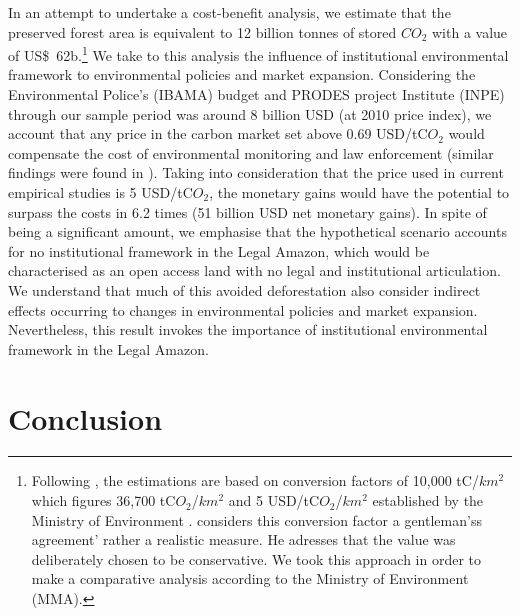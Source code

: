 In an attempt to undertake a cost-benefit analysis, we estimate that the preserved forest area is equivalent to 12 billion tonnes of stored $CO_{2}$ with a value of US\$\ 62b.\footnote{Following \citet{assuncao2015}, the estimations are based on conversion factors of 10,000 tC/$km^{2}$ which figures 36,700 tC$O_{2}$/$km^{2}$ and 5 USD/tC$O_{2}$/$km^{2}$ established by the Ministry of Environment \citep{MMMAwebsite}. \citet{fearnside_2016} considers this conversion factor a gentleman'ss agreement' rather a realistic measure. He adresses that the value was deliberately chosen to be conservative. We took this approach in order to make a comparative analysis according to the Ministry of Environment (MMA).} We take to this analysis the influence of institutional environmental framework to environmental policies and market expansion. Considering the Environmental Police's (IBAMA) budget and PRODES project Institute (INPE) through our sample period was around 8 billion USD (at 2010 price index), we account that any price in the carbon market set above 0.69 USD/tC$O_{2}$  would compensate the cost of environmental monitoring and law enforcement (similar findings were found in \citet{ASSUNCAO_2017}). Taking into consideration that the price used in current empirical studies is 5 USD/tC$O_{2}$, the monetary gains would have the potential to surpass the costs in 6.2 times (51 billion USD net monetary gains). In spite of being a significant amount, we emphasise that the hypothetical scenario accounts for no institutional framework in the Legal Amazon, which would be characterised as an open access land with no legal and institutional articulation. We understand that much of this avoided deforestation also consider indirect effects occurring to changes in environmental policies and market expansion. Nevertheless, this result invokes the importance of institutional environmental framework in the Legal Amazon.


\section{Conclusion}
\label{S:6}


